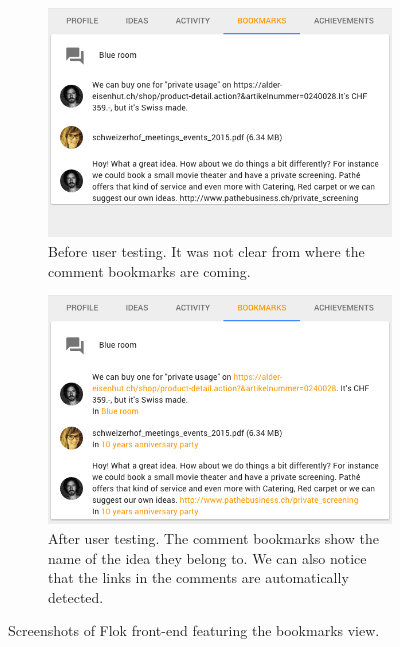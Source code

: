 \documentclass[a4paper,12pt, oneside]{article}
\begin{document}
\begin{figure}[!htb]
    \begin{subfigure}[t]{.495\textwidth}
        \includegraphics[width=\textwidth]{images/user_tests/bookmarks_before.png}
        \caption{Before user testing. It was not clear from where the comment bookmarks are coming.}
        \label{fig.tests.bookmarks.before}
    \end{subfigure}
    \hfill
    \begin{subfigure}[t]{.495\textwidth}
        \includegraphics[width=\textwidth]{images/user_tests/bookmarks_after.png}
        \caption{After user testing. The comment bookmarks show the name of the idea they belong to. We can also notice that the links in the comments are automatically detected.}
        \label{fig.tests.bookmarks.after}
    \end{subfigure}
    \caption{Screenshots of Flok front-end featuring the bookmarks view.}
    \label{fig.tests.bookmarks}
\end{figure}
\end{document}
